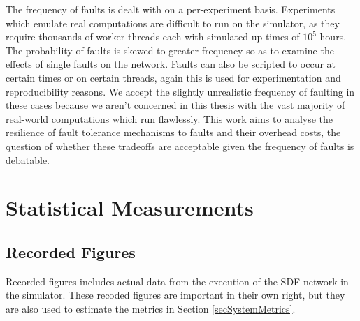 The frequency of faults is dealt with on a per-experiment basis.
Experiments which emulate real computations are difficult to run on the simulator, as they require thousands of worker threads each with simulated up-times of $10^5$ hours.
The probability of faults is skewed to greater frequency so as to examine the effects of single faults on the network.
Faults can also be scripted to occur at certain times or on certain threads, again this is used for experimentation and reproducibility reasons.
We accept the slightly unrealistic frequency of faulting in these cases because we aren't concerned in this thesis with the vast majority of real-world computations which run flawlessly.
This work aims to analyse the resilience of fault tolerance mechanisms to faults and their overhead costs, the question of whether these tradeoffs are acceptable given the frequency of faults is debatable.

\section{Statistical Measurements}
\label{secSystemStatistics}
\subsection{Recorded Figures}

Recorded figures includes actual data from the execution of the SDF network in the simulator.
These recoded figures are important in their own right, but they are also used to estimate the metrics in Section \ref{secSystemMetrics}.


